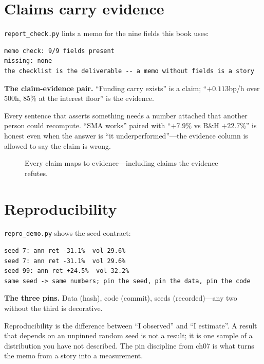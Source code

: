 \section{Claims carry evidence}\label{sec:claim}

\texttt{report\_check.py} lints a memo for the nine fields this book uses:
\begin{lstlisting}[numbers=none]
memo check: 9/9 fields present
missing: none
the checklist is the deliverable -- a memo without fields is a story
\end{lstlisting}

\begin{example}\label{ex:claim}
\textbf{The claim-evidence pair.} ``Funding carry exists'' is a claim;
``$+0.113$bp/h over 500h, 85\% at the interest floor'' is the evidence.
\begin{solution}
Every sentence that asserts something needs a number attached that another person could
recompute. ``SMA works'' paired with ``$+7.9\%$ vs B\&H $+22.7\%$'' is honest even when
the answer is ``it underperformed''---the evidence column is allowed to say the claim
is wrong.
\end{solution}
\end{example}

\begin{figure}[htbp]\centering

\caption{Every claim maps to evidence---including claims the evidence refutes.}
\label{fig:claim}
\end{figure}

\section{Reproducibility}\label{sec:repro}

\texttt{repro\_demo.py} shows the seed contract:
\begin{lstlisting}[numbers=none]
seed 7: ann ret -31.1%  vol 29.6%
seed 7: ann ret -31.1%  vol 29.6%
seed 99: ann ret +24.5%  vol 32.2%
same seed -> same numbers; pin the seed, pin the data, pin the code
\end{lstlisting}

\begin{example}\label{ex:repro}
\textbf{The three pins.} Data (hash), code (commit), seeds (recorded)---any two without
the third is decorative.
\begin{solution}
Reproducibility is the difference between ``I observed'' and ``I estimate''. A result
that depends on an unpinned random seed is not a result; it is one sample of a
distribution you have not described. The pin discipline from ch07 is what turns the
memo from a story into a measurement.
\end{solution}
\end{example}

